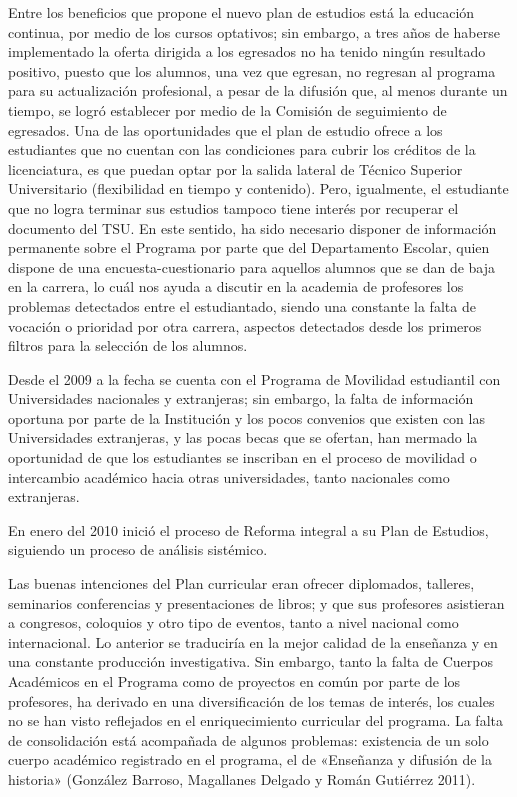 Entre los beneficios que propone el nuevo plan de estudios está la educación
continua, por medio de los cursos optativos; sin embargo, a tres años de
haberse implementado la oferta dirigida a los egresados no ha tenido ningún
resultado positivo, puesto que los alumnos, una vez que egresan, no regresan al
programa para su actualización profesional,  a pesar de la difusión que, al
menos durante un tiempo, se logró establecer por medio de la Comisión de
seguimiento de egresados. Una de las oportunidades que el plan de estudio
ofrece a los estudiantes que no cuentan con las condiciones  para cubrir
los créditos de la licenciatura, es que puedan optar por la salida lateral de
Técnico Superior Universitario (flexibilidad en tiempo y contenido). Pero,
igualmente, el estudiante que no logra terminar sus estudios tampoco tiene
interés por recuperar el documento del TSU. En este sentido, ha sido
necesario disponer de información permanente sobre el
Programa por parte que del Departamento Escolar, quien dispone de una 
encuesta-cuestionario para aquellos alumnos que se dan de baja en la carrera, 
lo cuál nos ayuda a discutir en la academia
de profesores los problemas detectados entre el estudiantado, siendo una
constante la falta de vocación o prioridad por otra carrera, aspectos
detectados desde los primeros filtros para la selección de los alumnos.


Desde el 2009 a la fecha se cuenta con el Programa de Movilidad estudiantil
con Universidades nacionales y extranjeras; sin embargo, la falta de
información  oportuna por parte de la Institución y los pocos convenios que
existen con las Universidades extranjeras, y las pocas becas que se
ofertan, han mermado la oportunidad de que los estudiantes se inscriban
en el proceso de movilidad o intercambio académico hacia  otras universidades, 
tanto nacionales como extranjeras.  

En enero del 2010 inició el proceso de Reforma integral a su Plan de Estudios, 
siguiendo un proceso de análisis sistémico. 

Las buenas intenciones del Plan curricular eran ofrecer diplomados, 
talleres, seminarios conferencias y presentaciones de libros; y que sus 
profesores asistieran a congresos, coloquios y otro tipo de eventos, 
tanto a nivel nacional como internacional. Lo anterior se traduciría en 
la mejor calidad de la enseñanza y en una constante producción 
investigativa. Sin embargo, tanto la falta de Cuerpos Académicos en el 
Programa como de proyectos en común por parte de los profesores, ha derivado en una 
diversificación de los temas de interés, los cuales no se han visto reflejados 
en el enriquecimiento curricular del programa. La falta de 
consolidación está acompañada de algunos problemas: existencia de un 
solo cuerpo académico registrado en el programa, el de «Enseñanza y difusión 
de la historia» (González Barroso, Magallanes Delgado y Román Gutiérrez 2011). 

